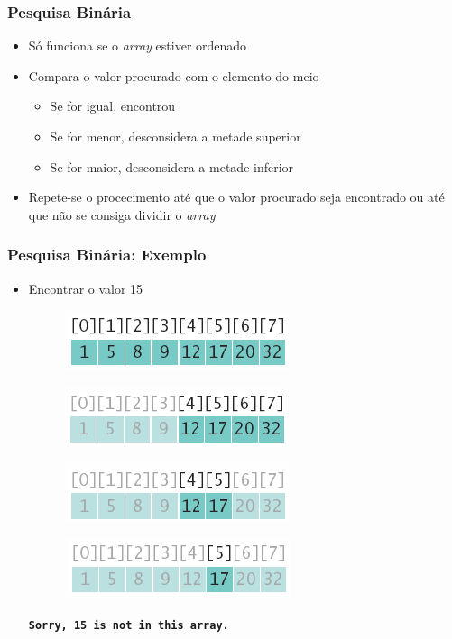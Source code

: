\documentclass[xcolor={dvipsnames,table},aspectratio=169]{beamer}
\begin{document}
\begin{frame}\frametitle{Pesquisa Binária}
\begin{itemize}
	\item Só funciona se o \emph{array} estiver ordenado
	\item Compara o valor procurado com o elemento do meio
	\begin{itemize}
		\item Se for igual, encontrou
		\item Se for menor, desconsidera a metade superior
		\item Se for maior, desconsidera a metade inferior
	\end{itemize}
	\item Repete-se o procecimento até que o valor procurado seja encontrado ou até que não se consiga dividir o \emph{array}
\end{itemize}
\end{frame}

\begin{frame}\frametitle{Pesquisa Binária: Exemplo}
\begin{itemize}
	\item Encontrar o valor 15
\begin{figure}[h]
	\includegraphics[height=0.10\paperheight,center]{pucrs-ep-fprog-unidade_06-arrays-laminas-pesquisa_binaria_1.png}
\end{figure}
\begin{figure}[h]
	\includegraphics[height=0.10\paperheight,center]{pucrs-ep-fprog-unidade_06-arrays-laminas-pesquisa_binaria_2.png}
\end{figure}
\begin{figure}[h]
	\includegraphics[height=0.10\paperheight,center]{pucrs-ep-fprog-unidade_06-arrays-laminas-pesquisa_binaria_3.png}
\end{figure}
\begin{figure}[h]
	\includegraphics[height=0.10\paperheight,center]{pucrs-ep-fprog-unidade_06-arrays-laminas-pesquisa_binaria_4.png}
\end{figure}
\textbf\texttt{Sorry, 15 is not in this array.}
\end{itemize}
\end{frame}
\end{document}
